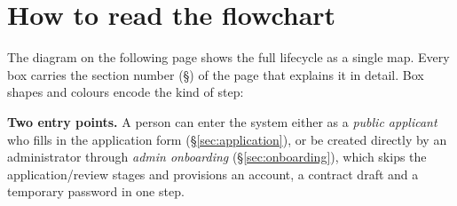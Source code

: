\documentclass[11pt,a4paper]{article}
\begin{document}
\section*{How to read the flowchart}

The diagram on the following page shows the full lifecycle as a single map.
Every box carries the section number (\S) of the page that explains it in
detail. Box shapes and colours encode the kind of step:

\vspace{0.4em}
\begin{center}
\end{center}

\vspace{0.4em}
\noindent\textbf{Two entry points.} A person can enter the system either as a
\emph{public applicant} who fills in the application form (\S\ref{sec:application}),
or be created directly by an administrator through \emph{admin onboarding}
(\S\ref{sec:onboarding}), which skips the application/review stages and
provisions an account, a contract draft and a temporary password in one step.

\clearpage
\end{document}
